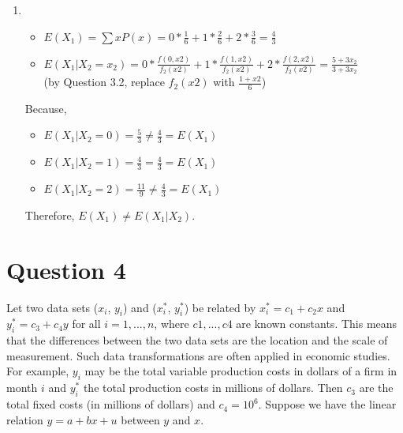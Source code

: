 \documentclass[12pt]{article}%
\begin{document}
\begin{enumerate}
    \item {}
    \begin{itemize}
        \item $E(X_1) = \sum xP(x) = 0*\frac{1}{6} + 1*\frac{2}{6} + 2*\frac{3}{6} = \frac{4}{3}$
        \item $E(X_1|X_2=x_2) = 0*\frac{f(0,x2)}{f_2(x2)} + 1*\frac{f(1,x2)}{f_2(x2)} + 2*\frac{f(2,x2)}{f_2(x2)} = \frac{5+3x_2}{3+3x_2}$\\
        (by Question 3.2, replace $f_2(x2)$ with $\frac{1+x2}{6}$)
    \end{itemize}
    Because,
    \begin{itemize}
        \item $E(X_1|X_2=0) = \frac{5}{3} \neq \frac{4}{3} = E(X_1)$
        \item $E(X_1|X_2=1) = \frac{4}{3} = \frac{4}{3} = E(X_1)$
        \item $E(X_1|X_2=2) = \frac{11}{9} \neq \frac{4}{3} = E(X_1)$
    \end{itemize}
    Therefore, $E(X_1) \neq E(X_1|X_2)$.
\end{enumerate}



\section{Question 4}     

Let two data sets ($x_i$, $y_i$) and ($x_i^*$, $y_i^*$) be related by $x_i^* = c_1 + c_2x$ and $y_i^* = c_3 + c_4y$ for all $i = 1,..., n$, where $c1, ..., c4$ are known constants. This means that the differences between the two data sets are the location and the scale of measurement. Such data transformations are often applied in economic studies. For example, $y_i$ may be the total variable production costs in dollars of a firm in month $i$ and $y_i^*$ the total production costs in millions of dollars. Then $c_3$ are the total fixed costs (in millions of dollars) and $c_4 = 10^6$. Suppose we have the linear relation $y = a + bx + u$ between $y$ and $x$.
\end{document}
